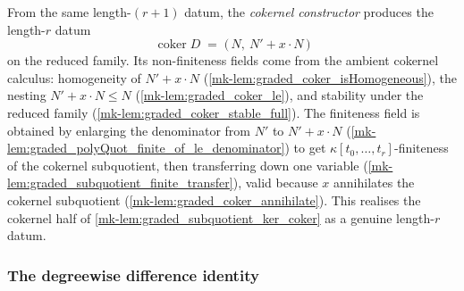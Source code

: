 \begin{definition}\label{mk-def:graded_subquotientDatum_coker}
  \leanok

  From the same length-\((r+1)\) datum, the \emph{cokernel constructor} produces the
  length-\(r\) datum
  \[
    \operatorname{coker} D \;=\; \bigl(\,N,\ N' + x \cdot N\,\bigr)
  \]
  on the reduced family. Its non-finiteness fields come from the ambient cokernel
  calculus: homogeneity of \(N' + x \cdot N\) (\ref{mk-lem:graded_coker_isHomogeneous}),
  the nesting \(N' + x \cdot N \le N\) (\ref{mk-lem:graded_coker_le}), and stability
  under the reduced family (\ref{mk-lem:graded_coker_stable_full}). The finiteness field
  is obtained by enlarging the denominator from \(N'\) to \(N' + x \cdot N\)
  (\ref{mk-lem:graded_polyQuot_finite_of_le_denominator}) to get
  \(\kappa[t_0, \dots, t_r]\)-finiteness of the cokernel subquotient, then
  transferring down one variable (\ref{mk-lem:graded_subquotient_finite_transfer}),
  valid because \(x\) annihilates the cokernel subquotient
  (\ref{mk-lem:graded_coker_annihilate}). This realises the cokernel half of
  \ref{mk-lem:graded_subquotient_ker_coker} as a genuine length-\(r\) datum.
\end{definition}

\subsubsection*{The degreewise difference identity}

